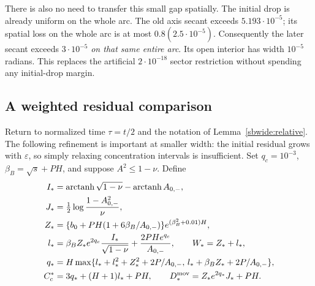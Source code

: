 \documentclass[11pt]{article}
\theoremstyle{remark}
\begin{document}
There is also no need to transfer this small gap spatially. The initial
drop is already uniform on the whole arc. The old axis secant exceeds
$5.193\cdot10^{-5}$; its spatial loss on the whole arc is at most
$0.8(2.5\cdot10^{-5})$. Consequently the later secant exceeds
$3\cdot10^{-5}$ \emph{on that same entire arc}. Its open interior has
width $10^{-5}$ radians. This replaces the artificial $2\cdot10^{-18}$
sector restriction without spending any initial-drop margin.

\subsection{A weighted residual comparison}

Return to normalized time $\tau=t/2$ and the notation of
Lemma~\ref{sbwide:relative}. The following refinement is important at
smaller width: the initial residual grows with $\varepsilon$, so simply
relaxing concentration intervals is insufficient.
Set $q_c=10^{-3}$, $\beta_B=\sqrt{s}+PH$, and suppose $A^2\le1-\nu$.
Define
\begin{align*}
 I_*&=\operatorname{arctanh}\sqrt{1-\nu}
                 -\operatorname{arctanh}A_{0,-},\\
 J_*&=\tfrac12\log\frac{1-A_{0,-}^2}{\nu},\\
 Z_*&=\{b_0+PH(1+6\beta_B/A_{0,-})\}
                  e^{(\beta_B^2+0.01)H},\\
 l_*&=\beta_B Z_*e^{2q_c}\frac{I_*}{\sqrt{1-\nu}}
               +\frac{2PH e^{q_c}}{A_{0,-}},\qquad W_*=Z_*+l_*,\\
 q_*&=H\max\{l_*+l_*^2+Z_*^2+2P/A_{0,-},\,
                     l_*+\beta_BZ_*+2P/A_{0,-}\},\\
 C_c^*&=3q_*+(H+1)l_*+PH,\qquad
 D_*^{\rm mov}=Z_*e^{2q_*}J_*+PH.
\end{align*}
\end{document}
